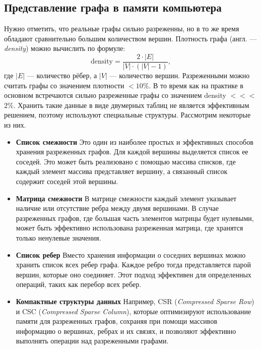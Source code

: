 \subsection{Представление графа в памяти компьютера}
Нужно отметить, что реальные графы сильно разреженны, но в то же время обладают сравнительно большим количеством вершин.
Плотность графа (англ. --- \textit{density}) можно вычислить по формуле: 
\begin{equation}
\label{eq:density}
	\text{density} = \frac{2 \cdot \big| E \big| }{\big| V \big| \cdot (\big| V \big| - 1)},
\end{equation}
где $\big| E \big|$ --- {количество рёбер}, а $\big| V \big|$ --- количество вершин.\linebreak
Разреженными можно считать графы со значением плотности $<10\%$. В то время как на практике в основном встречаются сильно разреженные графы со значением density $<<<$ $2\%$. \newline
Хранить такие данные в виде двумерных таблиц не является эффективным решением, поэтому используют специальные структуры. Рассмотрим некоторые из них.
\begin{itemize}
	\item{\textbf{Список смежности}} \newline
	Это один из наиболее простых и эффективных способов хранения разреженных графов. Для каждой вершины выделяется список ее соседей. Это может быть реализовано с помощью массива списков, где каждый элемент массива представляет вершину, а связанный список содержит соседей этой вершины.
    \item{\textbf{Матрица смежности}} \newline 
    В матрице смежности каждый элемент указывает наличие или отсутствие ребра между двумя вершинами. В случае разреженных графов, где большая часть элементов матрицы будет нулевыми, может быть эффективно использована разреженная матрица, где хранятся только ненулевые значения.
    \item{\textbf{Список ребер}} \newline 
    Вместо хранения информации о соседних вершинах можно хранить список всех ребер графа. Каждое ребро тогда представляется парой вершин, которые оно соединяет. Этот подход эффективен для определенных операций, таких как перебор всех ребер.
    \item{\textbf{Компактные структуры данных}} \newline
    Например, CSR (\textit{Compressed Sparse Row}) и CSC (\textit{Compressed Sparse Column}), которые оптимизируют использование памяти для разреженных графов, сохраняя при помощи массивов информацию о вершинах, ребрах и их связях, и позволяют эффективно выполнять операции над разреженными графами.
\end{itemize}

